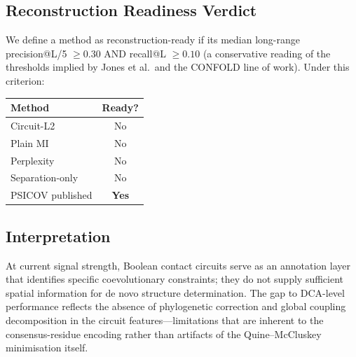 \subsection{Reconstruction Readiness Verdict}
We define a method as reconstruction-ready if its median long-range
precision@L/5 $\geq 0.30$ AND recall@L $\geq 0.10$ (a conservative reading of
the thresholds implied by Jones et al.\ and the CONFOLD line of work).  Under
this criterion:
\begin{center}
	\begin{tabular}{lc}
		\toprule
		Method           & Ready?       \\
		\midrule
		Circuit-L2       & No           \\
		Plain MI         & No           \\
		Perplexity       & No           \\
		Separation-only  & No           \\
		PSICOV published & \textbf{Yes} \\
		\bottomrule
	\end{tabular}
\end{center}

\subsection{Interpretation}
At current signal strength, Boolean contact circuits serve as an annotation
layer that identifies specific coevolutionary constraints; they do not supply
sufficient spatial information for de novo structure determination.  The gap
to DCA-level performance reflects the absence of phylogenetic correction and
global coupling decomposition in the circuit features---limitations that are
inherent to the consensus-residue encoding rather than artifacts of the
Quine--McCluskey minimisation itself.
